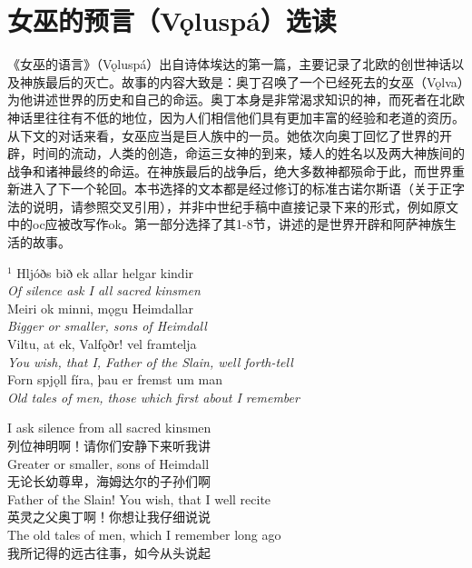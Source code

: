 \section{女巫的预言（Vǫluspá）选读}
《女巫的语言》（Vǫluspá）出自诗体埃达的第一篇，主要记录了北欧的创世神话以及神族最后的灭亡。故事的内容大致是：奥丁召唤了一个已经死去的女巫（Vǫlva）为他讲述世界的历史和自己的命运。奥丁本身是非常渴求知识的神，而死者在北欧神话里往往有不低的地位，因为人们相信他们具有更加丰富的经验和老道的资历。从下文的对话来看，女巫应当是巨人族中的一员。她依次向奥丁回忆了世界的开辟，时间的流动，人类的创造，命运三女神的到来，矮人的姓名以及两大神族间的战争和诸神最终的命运。在神族最后的战争后，绝大多数神都殒命于此，而世界重新进入了下一个轮回。本书选择的文本都是经过修订的标准古诺尔斯语（关于正字法的说明，请参照交叉引用），并非中世纪手稿中直接记录下来的形式，例如原文中的oc应被改写作ok。第一部分选择了其1-8节，讲述的是世界开辟和阿萨神族生活的故事。
\hspace*{\fill}\\ %
\begin{paracol}{2}
    \noindent
    $^1 $ Hljóðs bið ek allar helgar kindir\\
    \textit{Of silence ask I all sacred kinsmen}\\
    Meiri ok minni, mǫgu Heimdallar\footnotemark\\
    \textit{Bigger or smaller, sons of Heimdall}\\
    Viltu, at ek, Valfǫðr\footnotemark! vel framtelja\\
    \textit{You wish, that I, Father of the Slain, well forth-tell}\\
    Forn spjǫll fíra, þau er fremst um man\\
    \textit{Old tales of men, those which first about I remember}\\
    \switchcolumn

    \noindent
    I ask silence from all sacred kinsmen\\
    列位神明啊！请你们安静下来听我讲\\
    Greater or smaller, sons of Heimdall\\
    无论长幼尊卑，海姆达尔的子孙们啊\\
    Father of the Slain! You wish, that I well recite\\
    英灵之父奥丁啊！你想让我仔细说说\\
    The old tales of men, which I remember long ago\\
    我所记得的远古往事，如今从头说起\\
\end{paracol}
